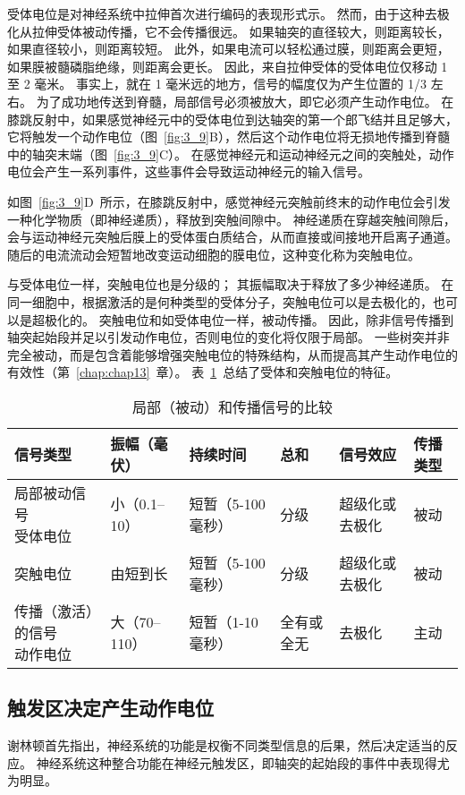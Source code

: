受体电位是对神经系统中拉伸首次进行编码的表现形式示。
然而，由于这种去极化从拉伸受体被动传播，它不会传播很远。
如果轴突的直径较大，则距离较长，如果直径较小，则距离较短。
此外，如果电流可以轻松通过膜，则距离会更短，如果膜被髓磷脂绝缘，则距离会更长。
因此，来自拉伸受体的受体电位仅移动 1 至 2 毫米。
事实上，就在 1 毫米远的地方，信号的幅度仅为产生位置的 1/3 左右。
为了成功地传送到脊髓，局部信号必须被放大，即它必须产生动作电位。
在膝跳反射中，如果感觉神经元中的受体电位到达轴突的第一个郎飞结并且足够大，它将触发一个动作电位（图~\ref{fig:3_9}B），然后这个动作电位将无损地传播到脊髓中的轴突末端（图~\ref{fig:3_9}C）。 
在感觉神经元和运动神经元之间的突触处，动作电位会产生一系列事件，这些事件会导致运动神经元的输入信号。


如图~\ref{fig:3_9}D~所示，在膝跳反射中，感觉神经元突触前终末的动作电位会引发一种化学物质（即神经递质），释放到突触间隙中。
神经递质在穿越突触间隙后，会与运动神经元突触后膜上的受体蛋白质结合，从而直接或间接地开启离子通道。
随后的电流流动会短暂地改变运动细胞的膜电位，这种变化称为突触电位。


与受体电位一样，突触电位也是分级的； 
其振幅取决于释放了多少神经递质。 
在同一细胞中，根据激活的是何种类型的受体分子，突触电位可以是去极化的，也可以是超极化的。 
突触电位和如受体电位一样，被动传播。 
因此，除非信号传播到轴突起始段并足以引发动作电位，否则电位的变化将仅限于局部。
一些树突并非完全被动，而是包含着能够增强突触电位的特殊结构，从而提高其产生动作电位的有效性（第~\ref{chap:chap13}~章）。 
表~\ref{tab:3_1}~总结了受体和突触电位的特征。


\begin{table}[htbp]
	\caption{局部（被动）和传播信号的比较} \label{tab:3_1} \centering
	\begin{tabular}{llllll}
		\toprule
		信号类型 & 振幅（毫伏） & 持续时间 & 总和 & 信号效应 & 传播类型\\
		\midrule
		\makecell{局部被动信号\\受体电位} & 小（0.1–10） & 短暂（5-100毫秒） & 分级 & 超级化或去极化 & 被动 \\
		\midrule
		突触电位 & 由短到长 & 短暂（5-100毫秒） & 分级 & 超级化或去极化 & 被动 \\
		\makecell{传播（激活）的信号\\动作电位} & 大（70–110） & 短暂（1-10毫秒） & 全有或全无 & 
		去极化 & 主动 \\
		\bottomrule
	\end{tabular}
\end{table}


\subsection{触发区决定产生动作电位}
谢林顿首先指出，神经系统的功能是权衡不同类型信息的后果，然后决定适当的反应。 
神经系统这种整合功能在神经元触发区，即轴突的起始段的事件中表现得尤为明显。


